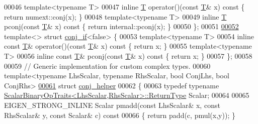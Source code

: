 \begin{DoxyCode}
00046   \textcolor{keyword}{template}<\textcolor{keyword}{typename} T>
00047   \textcolor{keyword}{inline} \hyperlink{group___sparse_core___module}{T} operator()(\textcolor{keyword}{const} \hyperlink{group___sparse_core___module}{T}& x)\textcolor{keyword}{ const }\{ \textcolor{keywordflow}{return} numext::conj(x); \}
00048   \textcolor{keyword}{template}<\textcolor{keyword}{typename} T>
00049   \textcolor{keyword}{inline} \hyperlink{group___sparse_core___module}{T} pconj(\textcolor{keyword}{const} \hyperlink{group___sparse_core___module}{T}& x)\textcolor{keyword}{ const }\{ \textcolor{keywordflow}{return} internal::pconj(x); \}
00050 \};
00051 
\hyperlink{struct_eigen_1_1internal_1_1conj__if_3_01false_01_4}{00052} \textcolor{keyword}{template}<> \textcolor{keyword}{struct }\hyperlink{struct_eigen_1_1internal_1_1conj__if}{conj\_if}<false> \{
00053   \textcolor{keyword}{template}<\textcolor{keyword}{typename} T>
00054   \textcolor{keyword}{inline} \textcolor{keyword}{const} \hyperlink{group___sparse_core___module}{T}& operator()(\textcolor{keyword}{const} \hyperlink{group___sparse_core___module}{T}& x)\textcolor{keyword}{ const }\{ \textcolor{keywordflow}{return} x; \}
00055   \textcolor{keyword}{template}<\textcolor{keyword}{typename} T>
00056   \textcolor{keyword}{inline} \textcolor{keyword}{const} \hyperlink{group___sparse_core___module}{T}& pconj(\textcolor{keyword}{const} \hyperlink{group___sparse_core___module}{T}& x)\textcolor{keyword}{ const }\{ \textcolor{keywordflow}{return} x; \}
00057 \};
00058 
00059 \textcolor{comment}{// Generic implementation for custom complex types.}
00060 \textcolor{keyword}{template}<\textcolor{keyword}{typename} LhsScalar, \textcolor{keyword}{typename} RhsScalar, \textcolor{keywordtype}{bool} ConjLhs, \textcolor{keywordtype}{bool} ConjRhs>
\hyperlink{struct_eigen_1_1internal_1_1conj__helper}{00061} \textcolor{keyword}{struct }\hyperlink{struct_eigen_1_1internal_1_1conj__helper}{conj\_helper}
00062 \{
00063   \textcolor{keyword}{typedef} \textcolor{keyword}{typename} \hyperlink{group___core___module_struct_eigen_1_1_scalar_binary_op_traits}{ScalarBinaryOpTraits<LhsScalar,RhsScalar>::ReturnType}
       Scalar;
00064 
00065   EIGEN\_STRONG\_INLINE Scalar pmadd(\textcolor{keyword}{const} LhsScalar& x, \textcolor{keyword}{const} RhsScalar& y, \textcolor{keyword}{const} Scalar& c)\textcolor{keyword}{ const}
00066 \textcolor{keyword}{  }\{ \textcolor{keywordflow}{return} padd(c, pmul(x,y)); \}

\end{DoxyCode}
